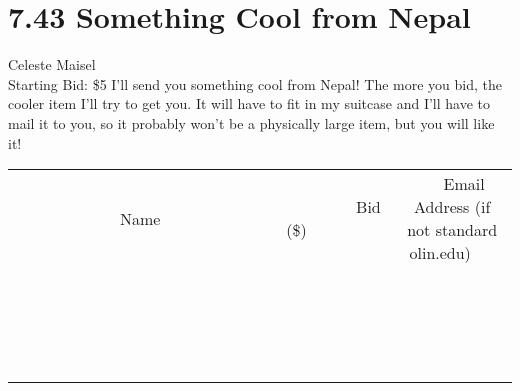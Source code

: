 \documentclass[11pt]{article}
\begin{document}
\section*{7.43 Something Cool from Nepal}
Celeste Maisel
\\
Starting Bid: \$5
\newline
I'll send you something cool from Nepal!  The more you bid, the cooler item I'll try to get you.  It will have to fit in my suitcase and I'll have to mail it to you, so it probably won't be a physically large item, but you will like it!
\\[3ex]
\begin{tabular}{c c c}
~~~~~~~~~~~~~Name~~~~~~~~~~~~~ & ~~~~~~~~~Bid (\$)~~~~~~~~~  & ~~~Email Address (if not standard olin.edu)~~~\\
 & & \\
\hline
 & & \\
\hline
 & & \\
\hline
 & & \\
\hline
 & & \\
\hline
 & & \\
\hline
 & & \\
\hline
 & & \\
\hline
 & & \\
\hline
 & & \\
\hline
 & & \\
\hline
 & & \\
\hline
 & & \\
\hline
 & & \\
\hline
 & & \\
\hline
 & & \\
\hline
 & & \\
\hline
 & & \\
\hline
 & & \\
\hline
\end{tabular}
\newpage
\end{document}
